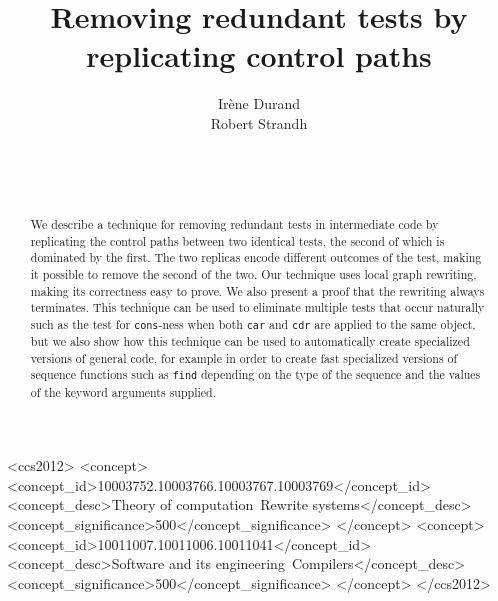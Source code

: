\documentclass{sig-alternate-05-2015}
\def\inputtex#1{}
\begin{document}
\title{Removing redundant tests by replicating control paths
}


\author{\alignauthor
Irène Durand\\
Robert Strandh\\
\\
\\
\\
}

\maketitle

\begin{abstract}
We describe a technique for removing redundant tests in intermediate
code by replicating the control paths between two identical tests, the
second of which is dominated by the first.  The two replicas encode
different outcomes of the test, making it possible to remove the
second of the two.  Our technique uses local graph rewriting, making
its correctness easy to prove.  We also present a proof that the
rewriting always terminates.  This technique can be used to eliminate
multiple tests that occur naturally such as the test for
\texttt{cons}-ness when both \texttt{car} and \texttt{cdr} are applied
to the same object, but we also show how this technique can be used to
automatically create specialized versions of general code, for example
in order to create fast specialized versions of sequence functions
such as \texttt{find} depending on the type of the sequence and the
values of the keyword arguments supplied.
\end{abstract}

\begin{CCSXML}
<ccs2012>
<concept>
<concept_id>10003752.10003766.10003767.10003769</concept_id>
<concept_desc>Theory of computation~Rewrite systems</concept_desc>
<concept_significance>500</concept_significance>
</concept>
<concept>
<concept_id>10011007.10011006.10011041</concept_id>
<concept_desc>Software and its engineering~Compilers</concept_desc>
<concept_significance>500</concept_significance>
</concept>
</ccs2012>
\end{CCSXML}


\printccsdesc


\inputtex{sec-introduction.tex}
\inputtex{sec-previous.tex}
\inputtex{sec-our-method.tex}
\inputtex{sec-benefits.tex}
\inputtex{sec-conclusions.tex}
\inputtex{sec-acknowledgments.tex}



\end{document}
